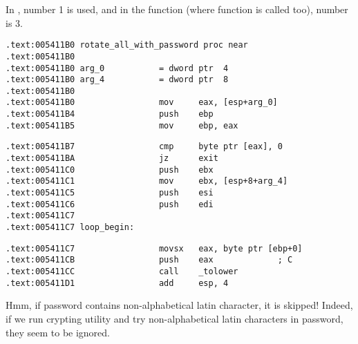 {In , number 1 is used, and in the  function (where  function 
is called too), number is 3.}

\begin{lstlisting}
.text:005411B0 rotate_all_with_password proc near
.text:005411B0
.text:005411B0 arg_0           = dword ptr  4
.text:005411B0 arg_4           = dword ptr  8
.text:005411B0
.text:005411B0                 mov     eax, [esp+arg_0]
.text:005411B4                 push    ebp
.text:005411B5                 mov     ebp, eax
\end{lstlisting}


\begin{lstlisting}
.text:005411B7                 cmp     byte ptr [eax], 0
.text:005411BA                 jz      exit
.text:005411C0                 push    ebx
.text:005411C1                 mov     ebx, [esp+8+arg_4]
.text:005411C5                 push    esi
.text:005411C6                 push    edi
.text:005411C7
.text:005411C7 loop_begin:
\end{lstlisting}


\begin{lstlisting}
.text:005411C7                 movsx   eax, byte ptr [ebp+0]
.text:005411CB                 push    eax             ; C
.text:005411CC                 call    _tolower
.text:005411D1                 add     esp, 4
\end{lstlisting}

{Hmm, if password contains non-alphabetical latin character, it is skipped! 
Indeed, if we run crypting utility and try non-alphabetical latin characters in password, 
they seem to be ignored.}

